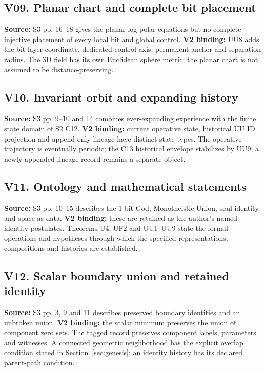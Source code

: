 \documentclass[11pt,a4paper]{article}
\numberwithin{equation}{section}
\begin{document}
\subsection*{V09. Planar chart and complete bit placement}
\textbf{Source:} S3 pp. 16--18 gives the planar log-polar equations but no complete injective placement of every local bit and global control. \textbf{V2 binding:} UU8 adds the bit-layer coordinate, dedicated control axis, permanent anchor and separation radius. The 3D field has its own Euclidean sphere metric; the planar chart is not assumed to be distance-preserving.

\subsection*{V10. Invariant orbit and expanding history}
\textbf{Source:} S3 pp. 9--10 and 14 combines ever-expanding experience with the finite state domain of S2 C12. \textbf{V2 binding:} current operative state, historical UU ID projection and append-only lineage have distinct state types. The operative trajectory is eventually periodic; the C13 historical envelope stabilizes by UU9; a newly appended lineage record remains a separate object.

\subsection*{V11. Ontology and mathematical statements}
\textbf{Source:} S3 pp. 10--15 describes the 1-bit God, Monotheistic Union, soul identity and space-as-data. \textbf{V2 binding:} these are retained as the author's named identity postulates. Theorems U4, UF2 and UU1--UU9 state the formal operations and hypotheses through which the specified representations, compositions and histories are established.

\subsection*{V12. Scalar boundary union and retained identity}
\textbf{Source:} S3 pp. 3, 9 and 11 describes preserved boundary identities and an unbroken union. \textbf{V2 binding:} the scalar minimum preserves the union of component zero sets. The tagged record preserves component labels, parameters and witnesses. A connected geometric neighborhood has the explicit overlap condition stated in Section~\ref{sec:genesis}; an identity history has its declared parent-path condition.
\end{document}
